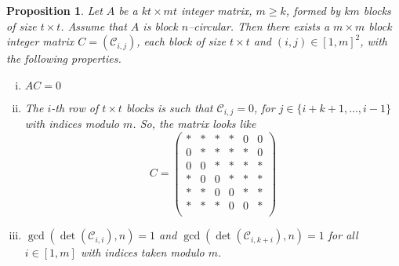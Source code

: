 \documentclass[10pt]{article}
\newtheorem{proposition}[theorem]{Proposition}
\begin{document}
\begin{proposition} \label{p.constr_c}
	Let $A$ be a $kt\times mt$ integer matrix, $m\geq k$, formed by $km$ blocks of size $t\times t$.
Assume that $A$ is block $n$--circular. Then there exists a $m\times m$ block integer matrix $C=(\mathcal{C}_{i,j})$,  each block of size $t\times t$ and $(i,j)\in[1,m]^2$, with the following properties.
\begin{enumerate}[i.]
\item \label{p.p0}
$AC=0$
\item \label{p.p1} The $i$-th row of $t\times t$ blocks is such that $\mathcal{C}_{i,j}=0$, for $j\in \{i+k+1,\ldots,i-1\}$ with indices modulo $m$. So, the matrix looks like
\begin{displaymath} 
	C=	\begin{pmatrix}
\ast & \ast & \ast & \ast & 0 & 0 \\
0& \ast & \ast & \ast & \ast & 0 \\
0&0& \ast & \ast & \ast & \ast  \\
\ast&0&0& \ast & \ast & \ast   \\
\ast&\ast&0&0& \ast & \ast    \\
\ast&\ast&\ast&0&0& \ast  \\
\end{pmatrix}
\end{displaymath}

\item \label{p.p2}
$\gcd(\det(\mathcal{C}_{i,i}),n)=1$ and $\gcd(\det(\mathcal{C}_{i,k+i}),n)=1$ for all $i\in[1,m]$ with indices taken modulo $m$.
\end{enumerate}
\end{proposition}
\end{document}
